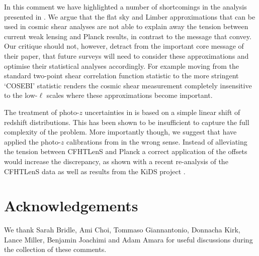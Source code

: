 In this comment we have highlighted a number of shortcomings in the analysis presented in \cite{kitching/etal:2016}.  We argue that the flat sky and Limber approximations that can be used in cosmic shear analyses are not able to explain away the tension between current weak lensing and Planck results, in contrast to the message that \cite{kitching/etal:2016} convey.  Our critique should not, however, detract from the important core message of their paper, that future surveys will need to consider these approximations and optimise their statistical analyses accordingly.  For example moving from the standard two-point shear correlation function statistic to the more stringent `COSEBI' statistic \citep{schneider/etal:2010} renders the cosmic shear measurement completely insensitive to the low-$\ell$ scales where these approximations become important.  

The treatment of photo-$z$ uncertainties in \cite{kitching/etal:2016} is based on a simple linear shift of redshift distributions. This has been shown to be insufficient to capture the full complexity of the problem.  More importantly though, we suggest that \cite{kitching/etal:2016} have applied the photo-$z$ calibrations from \cite{choi/etal:2016} in the wrong sense. Instead of alleviating the tension between CFHTLenS and Planck a correct application of the offsets would increase the discrepancy, as shown with a recent re-analysis of the CFHTLenS data \citep{joudaki/etal:2016} as well as results from the KiDS project \citep{hildebrandt/etal:2016}.

\section{Acknowledgements}
We thank Sarah Bridle, Ami Choi, Tommaso Giannantonio, Donnacha Kirk, Lance Miller, Benjamin Joachimi and Adam Amara for useful discussions during the collection of these comments.